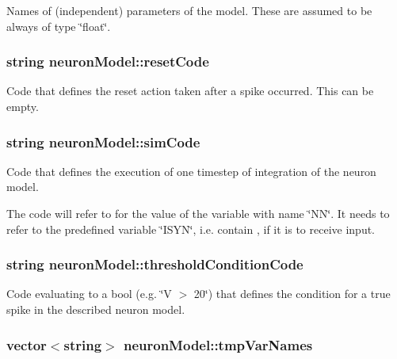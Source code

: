 Names of (independent) parameters of the model. These are assumed to be always of type \char`\"{}float\char`\"{}. 

\hypertarget{structneuronModel_ad97df9af00fba946865debf6cd539217}{
\subsubsection[{reset\+Code}]{\setlength{\rightskip}{0pt plus 5cm}string neuron\+Model\+::reset\+Code}}\label{structneuronModel_ad97df9af00fba946865debf6cd539217}


Code that defines the reset action taken after a spike occurred. This can be empty. 

\hypertarget{structneuronModel_a9e6536fd15b69fa24b708e41f97df899}{
\subsubsection[{sim\+Code}]{\setlength{\rightskip}{0pt plus 5cm}string neuron\+Model\+::sim\+Code}}\label{structneuronModel_a9e6536fd15b69fa24b708e41f97df899}


Code that defines the execution of one timestep of integration of the neuron model. 

The code will refer to  for the value of the variable with name \char`\"{}\+N\+N\char`\"{}. It needs to refer to the predefined variable \char`\"{}\+I\+S\+Y\+N\char`\"{}, i.\+e. contain , if it is to receive input. \hypertarget{structneuronModel_a9b0fae36963fb760040c3b1d22bee25c}{
\subsubsection[{threshold\+Condition\+Code}]{\setlength{\rightskip}{0pt plus 5cm}string neuron\+Model\+::threshold\+Condition\+Code}}\label{structneuronModel_a9b0fae36963fb760040c3b1d22bee25c}


Code evaluating to a bool (e.\+g. \char`\"{}\+V $>$ 20\char`\"{}) that defines the condition for a true spike in the described neuron model. 

\hypertarget{structneuronModel_ab193cb434db2df5f1fa9a79fba30af83}{
\subsubsection[{tmp\+Var\+Names}]{\setlength{\rightskip}{0pt plus 5cm}vector$<$string$>$ neuron\+Model\+::tmp\+Var\+Names}}\label{structneuronModel_ab193cb434db2df5f1fa9a79fba30af83}


